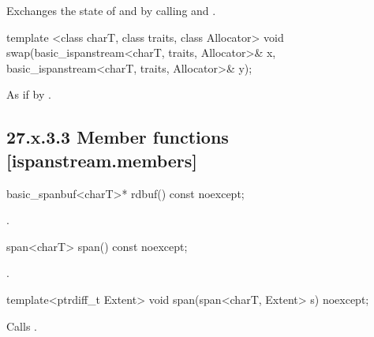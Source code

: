 \documentclass[ebook,11pt,article]{memoir}
\begin{document}
\begin{itemdescr}
\pnum
\effects Exchanges the state of  and
 by calling
 and
.
\end{itemdescr}


\begin{itemdecl}
template <class charT, class traits, class Allocator>
  void swap(basic_ispanstream<charT, traits, Allocator>& x,
            basic_ispanstream<charT, traits, Allocator>& y);
\end{itemdecl}

\begin{itemdescr}
\pnum
\effects As if by .
\end{itemdescr}

\subsection{27.x.3.3 Member functions [ispanstream.members]}
\label{ispanstream.members}

\begin{itemdecl}
basic_spanbuf<charT>* rdbuf() const noexcept;
\end{itemdecl}

\begin{itemdescr}
\pnum
\returns
{}.
\end{itemdescr}

\begin{itemdecl}
span<charT> span() const noexcept;
\end{itemdecl}

\begin{itemdescr}
\pnum
\returns
{}.
\end{itemdescr}

\begin{itemdecl}
template<ptrdiff_t Extent>
void span(span<charT, Extent> s) noexcept;
\end{itemdecl}

\begin{itemdescr}
\pnum
\effects
Calls
.
\end{itemdescr}

\end{document}
